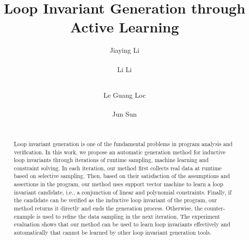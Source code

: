 \documentclass{sig-alternate-05-2015}
\begin{document}
    

\title{Loop Invariant Generation through Active Learning}

\author{
%
%
\alignauthor
Jiaying Li\\
       \\
\alignauthor
Li Li\\
       \\
\and  %
\alignauthor 
Le Guang Loc\\
       \\
\alignauthor 
Jun Sun\\
       \\
}

\maketitle

\begin{abstract}
	Loop invariant generation is one of the fundamental problems in program analysis and verification. 
    In this work, we propose an automatic generation method for inductive loop invariants 
    through iterations of runtime sampling, machine learning and constraint solving. 
    In each iteration, our method first collects real data at runtime based on selective sampling. 
    Then, based on their satisfaction of the assumptions and assertions in the program, 
    our method uses support vector machine to learn a loop invariant candidate, 
    i.e., a conjunction of linear and polynomial constraints. 
    Finally, if the candidate can be verified as the inductive loop invariant of the program, 
    our method returns it directly and ends the generation process. 
    Otherwise, the counter-example is used to refine the data sampling in the next iteration. 
    The experiment evaluation shows that our method can be used to learn loop invariants 
    effectively and automatically that cannot be learned by other loop invariant generation tools. 
\end{abstract}


% 









\end{document}
